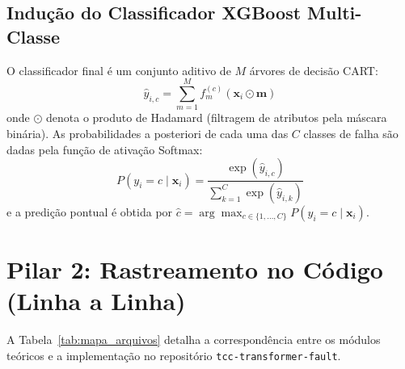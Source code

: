 \documentclass[11pt,a4paper]{article}
\begin{document}
\subsection{Indução do Classificador XGBoost Multi-Classe}
O classificador final é um conjunto aditivo de $M$ árvores de decisão CART:
\begin{equation}
  \hat{y}_{i, c} = \sum_{m=1}^M f_m^{(c)}(\mathbf{x}_i \odot \mathbf{m})
\end{equation}
onde $\odot$ denota o produto de Hadamard (filtragem de atributos pela máscara binária). As probabilidades a posteriori de cada uma das $C$ classes de falha são dadas pela função de ativação Softmax:
\begin{equation}
  P(y_i = c \mid \mathbf{x}_i) = \frac{\exp(\hat{y}_{i, c})}{\sum_{k=1}^C \exp(\hat{y}_{i, k})}
\end{equation}
e a predição pontual é obtida por $\hat{c} = \arg\max_{c \in \{1, \dots, C\}} P(y_i = c \mid \mathbf{x}_i)$.

\vspace{0.4cm}
\section{Pilar 2: Rastreamento no Código (Linha a Linha)}

A Tabela~\ref{tab:mapa_arquivos} detalha a correspondência entre os módulos teóricos e a implementação no repositório \texttt{tcc-transformer-fault}.
\end{document}
